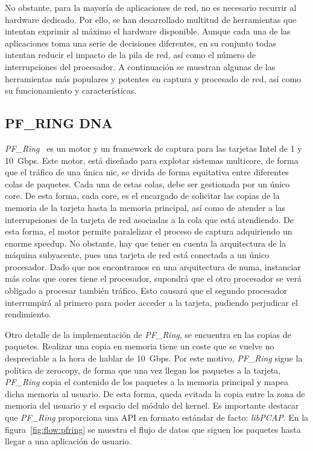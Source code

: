  No obstante, para la mayoría de aplicaciones de red, no es necesario recurrir al hardware dedicado. Por ello, se han desarrollado multitud de herramientas que intentan exprimir al máximo el hardware disponible. Aunque cada una de las aplicaciones toma una serie de decisiones diferentes, en su conjunto todas intentan reducir el impacto de la pila de red, así como el número de interrupciones del procesador. A continuación se muestran algunas de las herramientas más populares y potentes en captura y procesado de red, así como su funcionamiento y características.
 
\subsection{PF\_RING DNA}
\textit{PF\_Ring}~\cite{RizzoDMA,libzeroNTOP} es un motor y un framework de captura para las tarjetas Intel de 1 y 10~Gbps. Este motor, está diseñado para explotar sistemas \gls{multicore}, de forma que el tráfico de una única \gls{nic}, se divida de forma equitativa entre diferentes colas de paquetes. Cada una de estas colas, debe ser gestionada por un único \gls{core}. De esta forma, cada \gls{core}, es el encargado de solicitar las copias de la memoria de la tarjeta hasta la memoria principal, así como de atender a las interrupciones de la tarjeta de red asociadas a la cola que está atendiendo.
De esta forma, el motor permite paralelizar el proceso de captura adquiriendo un enorme speedup. No obstante, hay que tener en cuenta la arquitectura de la máquina subyacente, pues una tarjeta de red está conectada a un único procesador. Dado que nos encontramos en una arquitectura de \gls{numa}, instanciar más colas que \glspl{core} tiene el procesador, supondrá que el otro procesador se verá obligado a procesar también tráfico. Esto causará que el segundo procesador interrumpirá al primero para poder acceder a la tarjeta, pudiendo perjudicar el rendimiento.

Otro detalle de la implementación de \textit{PF\_Ring}, se encuentra en las copias de paquetes. Realizar una copia en memoria tiene un coste que se vuelve no despreciable a la hora de hablar de 10~Gbps. Por este motivo, \textit{PF\_Ring} sigue la política de \gls{zerocopy}, de forma que una vez llegan los paquetes a la tarjeta, \textit{PF\_Ring} copia el contenido de los paquetes a la memoria principal y mapea dicha memoria al usuario. De esta forma, queda evitada la copia entre la zona de memoria del usuario y el espacio del módulo del kernel.
Es importante destacar que \textit{PF\_Ring} proporciona una API en formato estándar de facto: \textit{libPCAP}.
En la figura~\ref{fig:flow:pfring} se muestra el flujo de datos que siguen los paquetes hasta llegar a una aplicación de usuario.

